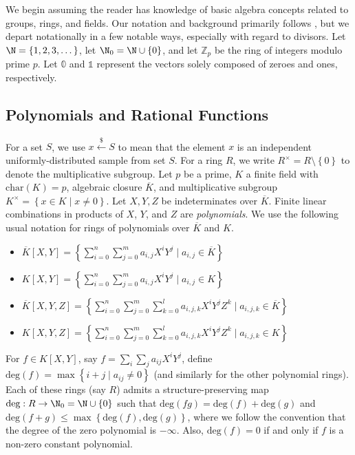 \documentclass[11pt,letterpaper]{article}
\newcommand{\polys}{K[X,Y]}
\theoremstyle{definition}
\newcommand{\6}{\mathbf}
\newcommand{\7}{\mathcal}
\newcommand{\lsamp}{\xleftarrow{\$}}
\newcommand{\one}{\mathbb{1}}
\newcommand{\zero}{\mathbb{0}}
\begin{document}
We begin assuming the reader has knowledge of basic algebra concepts related to groups, rings, and fields. Our notation and background primarily follows \cite{Silverman}, but we depart notationally in a few notable ways, especially with regard to divisors. Let $\N = \left\{1, 2, 3, \dots\right\}$, let $\N_0 = \N \cup \left\{0\right\}$, and let $\mathbb{Z}_p$ be the ring of integers modulo prime $p$. 
Let $\zero$ and $\one$ represent the vectors solely composed of zeroes and ones, respectively. 

\subsection{Polynomials and Rational Functions}

For a set $S$, we use $x \lsamp S$ to mean that the element $x$ is an independent uniformly-distributed sample from set $S$. For a ring $R$, we write $R^\times = R\setminus\left\{0\right\}$ to denote the multiplicative subgroup. 
Let $p$ be a prime, $K$ a finite field with $\text{char}(K) = p$, algebraic closure $\overline{K}$, and multiplicative subgroup $K^\times = \left\{x \in K \mid x \neq 0\right\}$. Let $X, Y, Z$ be indeterminates over $\overline{K}$. Finite linear combinations in products of $X$, $Y$, and $Z$ are \textit{polynomials}. We use the following usual notation for rings of polynomials over $\overline{K}$ and $K$.
\begin{itemize}

\item  $\overline{K}[X,Y] = \left\{\sum_{i=0}^{n}\sum_{j=0}^{m} a_{i,j} X^i Y^j \mid a_{i,j} \in \overline{K}\right\}$

\item $\polys = \left\{\sum_{i=0}^{n}\sum_{j=0}^{m}a_{i,j} X^iY^j \mid a_{i,j} \in K\right\}$

\item  $\overline{K}[X,Y,Z] = \left\{\sum_{i=0}^{n}\sum_{j=0}^{m} \sum_{k=0}^{l} a_{i,j,k} X^i Y^j Z^k \mid a_{i,j,k} \in \overline{K}\right\}$

\item $K[X,Y,Z] = \left\{\sum_{i=0}^{n}\sum_{j=0}^{m} \sum_{k=0}^{l} a_{i,j,k} X^i Y^j Z^k \mid a_{i,j,k} \in K\right\}$

\end{itemize}  

For $f \in \polys$, say $f = \sum_i \sum_j a_{ij} X^iY^j$, define $\text{deg}(f) = \max \left\{i+j \mid a_{ij} \neq 0\right\}$ (and similarly for the other polynomial rings). Each of these rings (say $R$) admits a structure-preserving map $\text{deg}:R \to \N_0 = \N \cup \left\{0\right\}$ such that $\text{deg}(fg) = \text{deg}(f) + \text{deg}(g)$ and $\text{deg}(f+g) \leq \max\left\{\text{deg}(f), \text{deg}(g)\right\}$, where we follow the convention that the degree of the zero polynomial is $- \infty$. Also, $\text{deg}(f) = 0$ if and only if $f$ is a non-zero constant polynomial.
\end{document}
